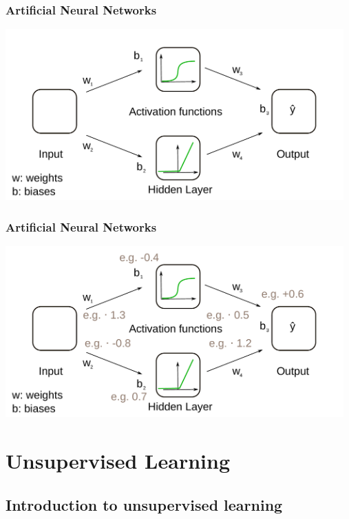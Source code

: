 \documentclass[aspectratio=169]{beamer}
\begin{document}
\begin{frame}
  \frametitle{Artificial Neural Networks}
  \begin{center}
    \includegraphics[width=13.0cm]{images/ANN_details_without_example_numbers.pdf}
  \end{center}  
\end{frame}

\begin{frame}
  \frametitle{Artificial Neural Networks}
  \begin{center}
    \includegraphics[width=13.0cm]{images/ANN_details_with_example_numbers.pdf}
  \end{center}  
\end{frame}

\section{Unsupervised Learning}

\setcounter{tocdepth}{1}
\begin{frame}{}
   \tableofcontents[currentsection]
\end{frame}

\subsection{Introduction to unsupervised learning}
\end{document}
